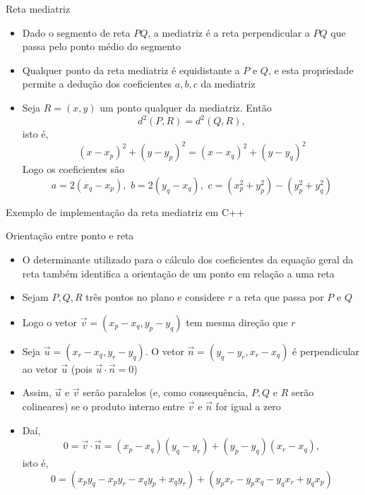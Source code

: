 \begin{frame}[fragile]{Reta mediatriz}

    \begin{itemize}
        \item Dado o segmento de reta $PQ$, a mediatriz é a reta perpendicular a $PQ$ que passa 
            pelo ponto médio do segmento

        \item Qualquer ponto da reta mediatriz é equidistante a $P$ e $Q$, e esta propriedade 
            permite a dedução dos coeficientes $a, b, c$ da mediatriz
        
        \item Seja $R = (x, y)$ um ponto qualquer da mediatriz. Então
        \[
            d^2(P, R) = d^2(Q, R),
        \]
        isto é,
        \[
            (x - x_p)^2 + (y - y_p)^2 = (x - x_q)^2 + (y - y_q)^2
        \]
        Logo os coeficientes são
        \[
            a = 2(x_q - x_p), \, \, b = 2(y_q - x_q), \, \, c = (x_p^2 + y_p^2) - (y_p^2 + y_q^2)
        \] 
    \end{itemize}

\end{frame}

\begin{frame}[fragile]{Exemplo de implementação da reta mediatriz em C++}
\end{frame}

\begin{frame}[fragile]{Orientação entre ponto e reta}

    \begin{itemize}
        \item O determinante utilizado para o cálculo dos coeficientes da equação geral da reta 
            também identifica a orientação de um ponto em relação a uma reta

        \item Sejam $P, Q, R$ três pontos no plano e considere $r$ a reta que passa por $P$ e $Q$

        \item Logo o vetor $\vec{v} = (x_p - x_q, y_p - y_q)$ tem mesma direção que $r$

        \item Seja $\vec{u} = (x_r - x_q, y_r - y_q)$. O vetor $\vec{n} = (y_q - y_r, x_r - x_q)$
        é perpendicular ao vetor $\vec{u}$ (pois $\vec{u}\cdot \vec{n} = 0$)

        \item Assim, $\vec{u}$ e $\vec{v}$ serão paralelos (e, como consequência, $P, Q$ e $R$ 
            serão colineares) se o produto interno entre $\vec{v}$ e $\vec{n}$ for igual a zero

        \item Daí,
        \[
            0 = \vec{v}\cdot \vec{n} = (x_p - x_q)(y_q - y_r) + (y_p - y_q)(x_r - x_q),
        \]
        isto é,
        \[
            0 = (x_py_q - x_py_r - x_qy_p + x_qy_r) + (y_px_r - y_px_q - y_qx_r + y_qx_p)
        \]
    \end{itemize}

\end{frame}


